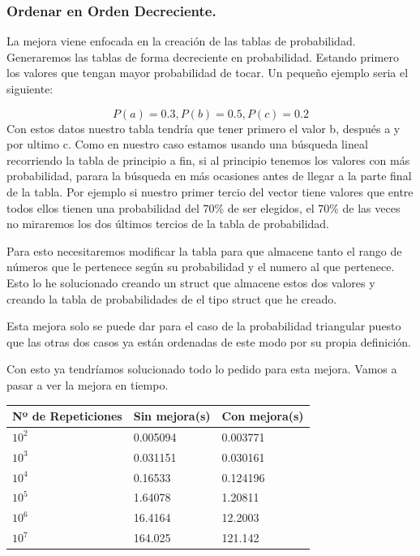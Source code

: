 \documentclass[]{article}
\begin{document}
\subsubsection{Ordenar en Orden Decreciente.}
La mejora viene enfocada en la creación de las tablas de probabilidad. Generaremos las tablas de forma decreciente en probabilidad. Estando primero los valores que tengan mayor probabilidad de tocar. 
Un pequeño ejemplo seria el siguiente:

$$P(a) = 0.3, P(b) = 0.5, P(c) = 0.2$$
\newline
Con estos datos nuestro tabla tendría que tener primero el valor b, después a y por ultimo c. Como en nuestro caso estamos usando una búsqueda lineal recorriendo la tabla de principio a fin, si al principio tenemos los valores con más probabilidad, parara la búsqueda en más ocasiones antes de llegar a la parte final de la tabla. Por ejemplo si nuestro primer tercio del vector tiene valores que entre todos ellos tienen una probabilidad del 70\% de ser elegidos, el 70\% de las veces no miraremos los dos últimos tercios de la tabla de probabilidad.
\newline

Para esto necesitaremos modificar la tabla para que almacene tanto el rango de números que le pertenece según su probabilidad y el numero al que pertenece. Esto lo he solucionado creando un struct que almacene estos dos valores y creando la tabla de probabilidades de el tipo struct que he creado. 
\newline

Esta mejora solo se puede dar para el caso de la probabilidad triangular puesto que las otras dos casos ya están ordenadas de este modo por su propia definición.

Con esto ya tendríamos solucionado todo lo pedido para esta mejora. Vamos a pasar a ver la mejora en tiempo.

\begin{table}[H]
	\begin{center}
		\begin{tabular}{|l|l|l|}
			
			\hline
			Nº de Repeticiones & Sin mejora(s) & Con mejora(s)\\
			\hline \hline
			$10^{2}$ & 0.005094  &  0.003771
			\\ \hline
			$10^{3}$ & 0.031151  &  0.030161
			\\ \hline
			$10^{4}$ & 0.16533  &  0.124196
			\\ \hline
			$10^{5}$ & 1.64078 &  1.20811
			\\ \hline
			$10^{6}$ &  16.4164 &  12.2003
			\\ \hline
			$10^{7}$ & 164.025  &  121.142
			\\ \hline
		\end{tabular}
		
		\label{tabla:sencilla}
	\end{center}
\end{table}
\end{document}
